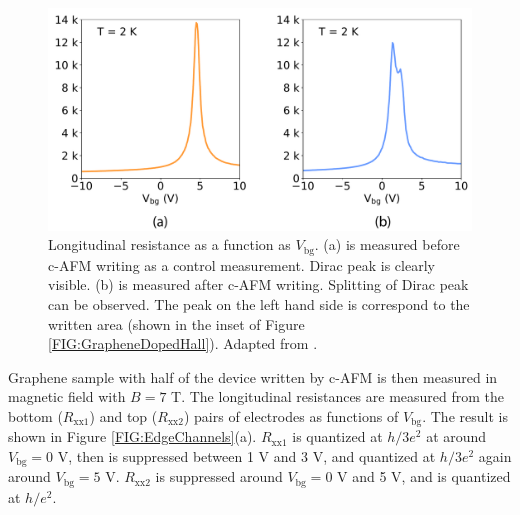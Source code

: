 \documentclass[pdflatex, sectionletters, 12pt]{pittetd}    %
\begin{document}
\begin{figure}[h!]
	\centering
	\includegraphics[width=.75\textwidth]{Drawing/DiracPointSplit.pdf}
	\caption{Longitudinal resistance as a function as $V_\mathrm{bg}$. (a) is measured before c-AFM writing as a control measurement. Dirac peak is clearly visible. (b) is measured after c-AFM writing. Splitting of Dirac peak can be observed. The peak on the left hand side is correspond to the written area (shown in the inset of Figure \ref{FIG:GrapheneDopedHall}). Adapted from \cite{li2019reconfigurable}.}
	\label{FIG:DiracPointSplit}
\end{figure}

Graphene sample with half of the device written by c-AFM is then measured in magnetic field with $B = 7$ T. The longitudinal resistances are measured from the bottom ($R_\mathrm{xx1}$) and top ($R_\mathrm{xx2}$) pairs of electrodes as functions of $V_\mathrm{bg}$. The result is shown in Figure \ref{FIG:EdgeChannels}(a). $R_\mathrm{xx1}$ is quantized at $h/3e^2$ at around $V_\mathrm{bg} = 0$ V, then is suppressed between 1 V and 3 V, and quantized at $h/3e^2$ again around $V_\mathrm{bg} = 5$ V. $R_\mathrm{xx2}$ is suppressed around $V_\mathrm{bg} = 0$ V and 5 V, and is quantized at $h/e^2$. 
\end{document}
